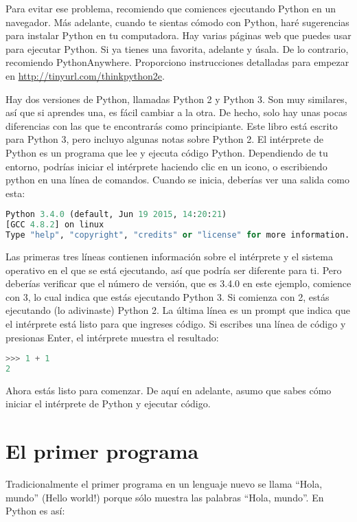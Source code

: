 Para evitar ese problema, recomiendo que comiences ejecutando Python en un navegador. Más adelante, cuando te sientas cómodo con Python, haré sugerencias para instalar Python en tu computadora.
Hay varias páginas web que puedes usar para ejecutar Python. Si ya tienes una favorita, adelante y úsala. De lo contrario, recomiendo PythonAnywhere. Proporciono instrucciones detalladas para empezar en \href{http://tinyurl.com/thinkpython2e}{http://tinyurl.com/thinkpython2e}.

Hay dos versiones de Python, llamadas Python 2 y Python 3. Son muy similares, así que si aprendes una, es fácil cambiar a la otra. De hecho, solo hay unas pocas diferencias con las que te encontrarás como principiante. Este libro está escrito para Python 3, pero incluyo algunas notas sobre Python 2.
El intérprete de Python es un programa que lee y ejecuta código Python. Dependiendo de tu entorno, podrías iniciar el intérprete haciendo clic en un icono, o escribiendo python en una línea de comandos. Cuando se inicia, deberías ver una salida como esta:

\begin{lstlisting}[language=Python, basicstyle=\ttfamily]
Python 3.4.0 (default, Jun 19 2015, 14:20:21)
[GCC 4.8.2] on linux
Type "help", "copyright", "credits" or "license" for more information.
\end{lstlisting}

Las primeras tres líneas contienen información sobre el intérprete y el sistema operativo en el que se está ejecutando, así que podría ser diferente para ti. Pero deberías verificar que el número de versión, que es 3.4.0 en este ejemplo, comience con 3, lo cual indica que estás ejecutando Python 3. Si comienza con 2, estás ejecutando (lo adivinaste) Python 2.
La última línea es un prompt que indica que el intérprete está listo para que ingreses código. Si escribes una línea de código y presionas Enter, el intérprete muestra el resultado:

\begin{lstlisting}[language=Python, basicstyle=\ttfamily]
>>> 1 + 1
2
\end{lstlisting}

Ahora estás listo para comenzar. De aquí en adelante, asumo que sabes cómo iniciar el intérprete de Python y ejecutar código.

\section{El primer programa}
Tradicionalmente el primer programa en un lenguaje nuevo se llama “Hola,
mundo” (Hello world!) porque sólo muestra las palabras “Hola, mundo”.
En Python es así:

